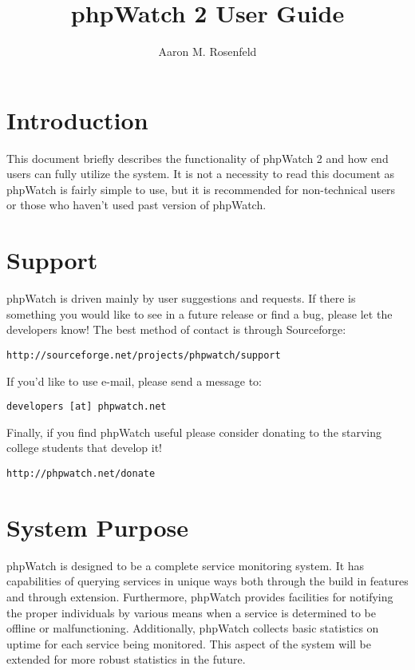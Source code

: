 \documentclass[10pt]{article}
\title{phpWatch 2 User Guide}
\author{Aaron M. Rosenfeld}
\begin{document}
\maketitle

\section{Introduction}
This document briefly describes the functionality of phpWatch 2 and how end users can fully utilize the system.  It is
not a necessity to read this document as phpWatch is fairly simple to use, but it is recommended for non-technical users
or those who haven't used past version of phpWatch.

\section{Support}
phpWatch is driven mainly by user suggestions and requests.  If there is something you would like to see in a future
release or find a bug, please let the developers know!  The best method of contact is through Sourceforge:

\begin{center} \texttt{http://sourceforge.net/projects/phpwatch/support} \end{center}

If you'd like to use e-mail, please send a message to:

\begin{center} \texttt{developers [at] phpwatch.net} \end{center}

Finally, if you find phpWatch useful please consider donating to the starving college students that develop it!

\begin{center} \texttt{http://phpwatch.net/donate} \end{center}

\section{System Purpose}
phpWatch is designed to be a complete service monitoring system.  It has capabilities of querying services in unique
ways both through the build in features and through extension.  Furthermore, phpWatch provides facilities for
notifying the proper individuals by various means when a service is determined to be offline or malfunctioning.
Additionally, phpWatch collects basic statistics on uptime for each service being monitored.  This aspect of the system
will be extended for more robust statistics in the future.
\end{document}
